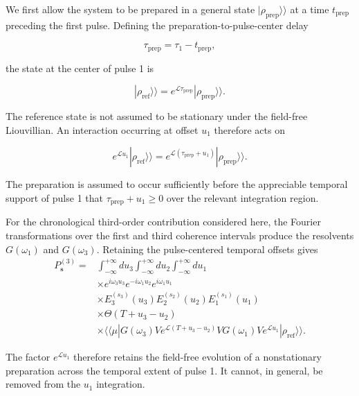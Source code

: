 \documentclass[11pt]{article}
\begin{document}
We first allow the system to be prepared in a general state
$|\rho_{\mathrm{prep}}\rangle\rangle$ at a time $t_{\mathrm{prep}}$
preceding the first pulse. Defining the preparation-to-pulse-center
delay

\begin{equation}
\tau_{\mathrm{prep}}
=
\tau_1-t_{\mathrm{prep}},
\end{equation}

the state at the center of pulse 1 is

\begin{equation}
|\rho_{\mathrm{ref}}\rangle\rangle
=
e^{\mathcal{L}\tau_{\mathrm{prep}}}
|\rho_{\mathrm{prep}}\rangle\rangle.
\label{eq:rho_ref_definition}
\end{equation}

The reference state is not assumed to be stationary under the
field-free Liouvillian. An interaction occurring at offset $u_1$
therefore acts on

\begin{equation}
e^{\mathcal{L}u_1}
|\rho_{\mathrm{ref}}\rangle\rangle
=
e^{\mathcal{L}(\tau_{\mathrm{prep}}+u_1)}
|\rho_{\mathrm{prep}}\rangle\rangle.
\end{equation}

The preparation is assumed to occur sufficiently before the
appreciable temporal support of pulse 1 that
$\tau_{\mathrm{prep}}+u_1\geq0$ over the relevant integration region.

For the chronological third-order contribution considered here, the
Fourier transformations over the first and third coherence intervals
produce the resolvents $G(\omega_1)$ and $G(\omega_3)$. Retaining the
pulse-centered temporal offsets gives
%
\begin{align}
P_{\mathbf{s}}^{(3)}
={}&
\int_{-\infty}^{+\infty}du_3
\int_{-\infty}^{+\infty}du_2
\int_{-\infty}^{+\infty}du_1
\nonumber\\
&\times
e^{i\omega_3u_3}
e^{-i\omega_1u_2}
e^{i\omega_1u_1}
\nonumber\\
&\times
E_3^{(s_3)}(u_3)
E_2^{(s_2)}(u_2)
E_1^{(s_1)}(u_1)
\nonumber\\
&\times
\Theta(T+u_3-u_2)
\nonumber\\
&\times
\langle\!\langle\mu|
G(\omega_3)
V
e^{\mathcal{L}(T+u_3-u_2)}
V
G(\omega_1)
V
e^{\mathcal{L}u_1}
|\rho_{\mathrm{ref}}\rangle\rangle .
\label{eq:finite_pulse_general_integral}
\end{align}

The factor $e^{\mathcal{L}u_1}$ therefore retains the field-free
evolution of a nonstationary preparation across the temporal extent of
pulse 1. It cannot, in general, be removed from the $u_1$ integration.
\end{document}
